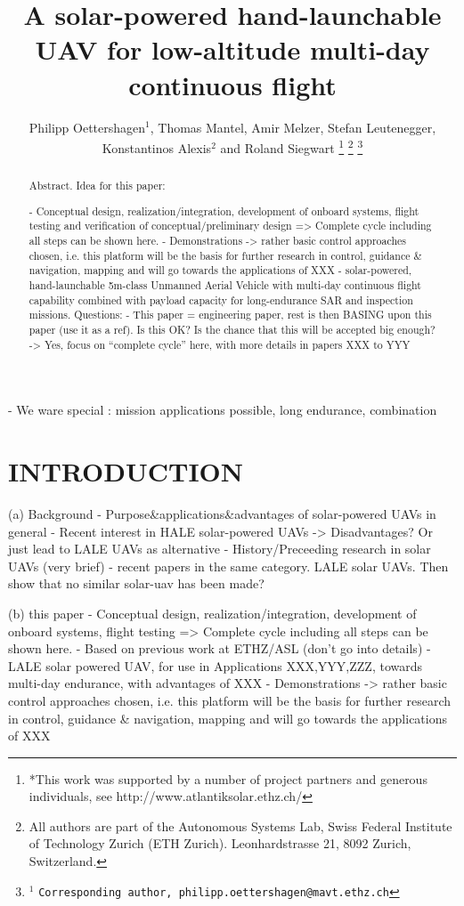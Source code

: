 \documentclass[letterpaper, 10 pt, conference]{ieeeconf}  %
\title{\LARGE \bf
A solar-powered hand-launchable UAV for low-altitude multi-day continuous flight
}
\author{Philipp Oettershagen$^{1}$, Thomas Mantel, Amir Melzer, Stefan Leutenegger, Konstantinos Alexis$^{2}$ and Roland Siegwart%
\thanks{*This work was supported by a number of project partners and generous individuals, see http://www.atlantiksolar.ethz.ch/  }%
\thanks{All authors are part of the Autonomous Systems Lab, Swiss Federal Institute of Technology Zurich (ETH Zurich). Leonhardstrasse 21, 8092 Zurich, Switzerland. }
\thanks{$^{1}$
        {\tt\small Corresponding author, philipp.oettershagen@mavt.ethz.ch}}%
}
\begin{document}
\maketitle
\thispagestyle{empty}
\pagestyle{empty}

\begin{abstract}

Abstract. Idea for this paper:

 - Conceptual design, realization/integration, development of onboard systems, flight testing and verification of conceptual/preliminary design => Complete cycle including all steps can be shown here.
   - Demonstrations -> rather basic control approaches chosen, i.e. this platform will be the basis for further research in control, guidance \& navigation, mapping and will go towards the applications of XXX
    - solar-powered, hand-launchable 5m-class Unmanned Aerial Vehicle with multi-day continuous flight capability combined with payload capacity for long-endurance SAR and inspection missions.
Questions:
      - This paper = engineering paper, rest is then BASING upon this paper (use it as a ref). Is this OK? Is the chance that this will be accepted big enough? -> Yes, focus on ``complete cycle'' here, with more details in papers XXX to YYY

\end{abstract}



 - We ware special : mission applications possible, long endurance, combination
\section{INTRODUCTION}



  (a) Background
    - Purpose\&applications\&advantages of solar-powered UAVs in general
  - Recent interest in HALE solar-powered UAVs -> Disadvantages? Or just lead to LALE UAVs as alternative
  - History/Preceeding research in solar UAVs (very brief)
      - recent papers in the same category. LALE solar UAVs. Then show that no similar solar-uav has been made?

  (b) this paper
   - Conceptual design, realization/integration, development of onboard systems, flight testing => Complete cycle including all steps can be shown here.
   - Based on  previous work at ETHZ/ASL (don't go into details)
   - LALE solar powered UAV, for use in Applications XXX,YYY,ZZZ, towards multi-day endurance, with advantages of XXX
   - Demonstrations -> rather basic control approaches chosen, i.e. this platform will be the basis for further research in control, guidance \& navigation, mapping and will go towards the applications of XXX
  
\end{document}

